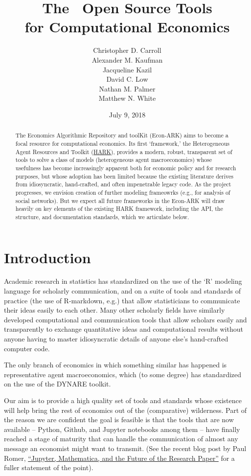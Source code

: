 \message{ !name(ccarroll_et_al_scipy_2018.tex)}\documentclass[10pt,twocolumn]{article}
\title{The \EconARK~Open Source Tools \\ for Computational Economics}
\author{Christopher D. Carroll \\ Alexander M. Kaufman \\ Jacqueline Kazil \\ David C. Low \\ Nathan M. Palmer \\ Matthew N. White}
\date{July 9, 2018}
\begin{document}

\maketitle
\begin{abstract}
  The Economics Algorithmic Repository and toolKit (Econ-ARK) aims to become a focal resource for computational economics. Its first `framework,' the Heterogeneous Agent Resources and Toolkit (\href{http://github.com/econ-ark/HARK}{HARK}), provides a modern, robust, transparent set of tools to solve a class of models (heterogeneous agent macroeconomics) whose usefulness has become increasingly apparent both for economic policy and for research purposes, but whose adoption has been limited because the existing literature derives from idiosyncratic, hand-crafted, and often impenetrable legacy code. As the project progresses, we envision creation of further modeling frameowrks (e.g., for analysis of social networks).  But we expect all future frameworks in the Econ-ARK will draw heavily on key elements of the existing HARK framework, including the API, the structure, and documentation standards, which we articulate below.
\end{abstract}


\section{Introduction}\label{introduction}

Academic research in statistics has standardized on the use of the `R' modeling language for scholarly
communication, and on a suite of tools and standards of practice (the use of R-markdown, e.g.) that allow statisticians to communicate their ideas easily to each other. Many other scholarly fields have similarly developed computational and communication tools that allow scholars easily and transparently to exchange quantitative ideas and computational results without anyone having to master idiosyncratic details of anyone else's hand-crafted computer code.

The only branch of economics in which something similar has happened is representative agent macroeconomics, which (to some degree) has standardized on the use of the DYNARE toolkit.

Our aim is to provide a high quality set of tools and standards whose existence will help bring the rest of economics out of the (comparative) wilderness. Part of the reason we are confident the goal is feasible is that the tools that are now available -- Python, Github, and Jupyter notebooks among them -- have finally reached a stage of maturity that can handle the communication of almost any message an economist might want to transmit.  (See the recent blog post by Paul Romer, \href{https://paulromer.net/jupyter-mathematica-and-the-future-of-the-research-paper/}{``Jupyter, Mathematica, and the Future of the Research Paper''} for a fuller statement of the point).
\end{document}
